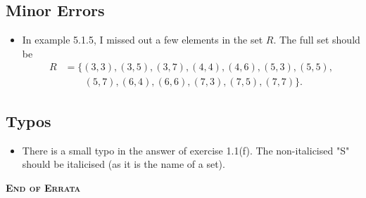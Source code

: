 \documentclass[
    a4paper,
    chapterprefix,
    DIV=9
]{scrartcl}
\begin{document}
\subsection*{Minor Errors}
\begin{itemize}
    \item In example 5.1.5, I missed out a few elements in the set $R$. The full set should be
    \begin{align*}
        R &= \{(3, 3), (3, 5), (3, 7), (4, 4), (4, 6), (5, 3), (5, 5),\\
        &\quad\quad(5, 7), (6, 4), (6, 6), (7, 3), (7, 5), (7, 7)\}.
    \end{align*}
\end{itemize}

\subsection*{Typos}
\begin{itemize}
    \item There is a small typo in the answer of exercise 1.1(f). The non-italicised "S" should be italicised (as it is the name of a set).
\end{itemize}

\begin{center}
    \vfill
    {\Large\bfseries\scshape End of Errata}
\end{center}
\end{document}
